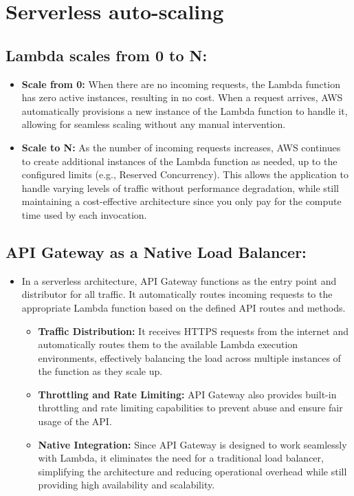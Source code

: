 \section{Serverless auto-scaling}
\subsection{Lambda scales from 0 to N:}
\begin{itemize}
  \item \textbf{Scale from 0:} When there are no incoming requests, the Lambda function has zero active instances, resulting in no cost. When a request arrives, AWS automatically provisions a new instance of the Lambda function to handle it, allowing for seamless scaling without any manual intervention.
  \item \textbf{Scale to N:} As the number of incoming requests increases, AWS continues to create additional instances of the Lambda function as needed, up to the configured limits (e.g., Reserved Concurrency). This allows the application to handle varying levels of traffic without performance degradation, while still maintaining a cost-effective architecture since you only pay for the compute time used by each invocation.
\end{itemize}

\subsection{API Gateway as a Native Load Balancer:}
\begin{itemize}
  \item In a serverless architecture, API Gateway functions as the entry point and distributor for all traffic. It automatically routes incoming requests to the appropriate Lambda function based on the defined API routes and methods.
  \begin{itemize}
    \item \textbf{Traffic Distribution:} It receives HTTPS requests from the internet and automatically routes them to the available Lambda execution environments, effectively balancing the load across multiple instances of the function as they scale up.
    \item \textbf{Throttling and Rate Limiting:} API Gateway also provides built-in throttling and rate limiting capabilities to prevent abuse and ensure fair usage of the API.
    \item \textbf{Native Integration:} Since API Gateway is designed to work seamlessly with Lambda, it eliminates the need for a traditional load balancer, simplifying the architecture and reducing operational overhead while still providing high availability and scalability.
  \end{itemize}
\end{itemize}

